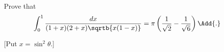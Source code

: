Prove that
\[
\int_{0}^{1} \frac{dx}{(1 + x)(2 + x) \sqrtb{x(1 - x)}}
  = \pi\left(\frac{1}{\sqrt{2}} - \frac{1}{\sqrt{6}}\right)\Add{.}
\]

[Put $x = \sin^{2}\theta$.]  


